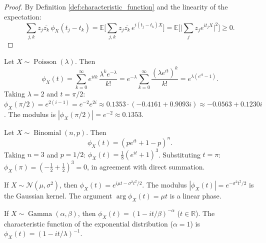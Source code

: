 \begin{proof}
By Definition \ref{def:characteristic_function} and the linearity of the expectation:
\[
\sum_{j,k} z_j \overline{z_k}\, \phi_X(t_j - t_k)
= \mathbb{E}\Big[ \sum_{j,k} z_j \overline{z_k}\, e^{i(t_j - t_k) X} \Big]
= \mathbb{E}\Big[ \Big| \sum_{j} z_j e^{it_j X} \Big|^2 \Big] \ge 0.
\]
\end{proof}

\begin{example}\label{ch14_poisson_char_example}
Let $X \sim \operatorname{Poisson}(\lambda)$. Then
\[
\phi_X(t) = \sum_{k=0}^{\infty} e^{itk}\, \frac{\lambda^k e^{-\lambda}}{k!}
= e^{-\lambda} \sum_{k=0}^{\infty} \frac{(\lambda e^{it})^k}{k!}
= e^{\lambda (e^{it} - 1)}.
\]
Taking $\lambda = 2$ and $t = \pi/2$: $\phi_X(\pi/2) = e^{2(i-1)} = e^{-2} e^{2i} \approx 0.1353 \cdot (-0.4161 + 0.9093 i) \approx -0.0563 + 0.1230 i$. The modulus is $|\phi_X(\pi/2)| = e^{-2} \approx 0.1353$.
\end{example}

\begin{example}\label{ch14_binomial_char_example}
Let $X \sim \operatorname{Binomial}(n, p)$. Then
\[
\phi_X(t) = (p e^{it} + 1 - p)^n.
\]
Taking $n = 3$ and $p = 1/2$: $\phi_X(t) = \tfrac18 (e^{it} + 1)^3$. Substituting $t = \pi$: $\phi_X(\pi) = (-\tfrac12 + \tfrac12)^3 = 0$, in agreement with direct summation.
\end{example}

\begin{example}\label{ex:normal_characteristic}
If $X \sim \mathcal{N}(\mu, \sigma^2)$, then $\phi_X(t) = e^{i\mu t - \sigma^2 t^2/2}$. The modulus $|\phi_X(t)| = e^{-\sigma^2 t^2/2}$ is the Gaussian kernel. The argument $\arg \phi_X(t) = \mu t$ is a linear phase.
\end{example}

\begin{example}\label{ex:gamma_characteristic}
If $X \sim \operatorname{Gamma}(\alpha, \beta)$, then $\phi_X(t) = (1 - it/\beta)^{-\alpha}$ ($t \in \mathbb{R}$). The characteristic function of the exponential distribution ($\alpha = 1$) is $\phi_X(t) = (1 - it/\lambda)^{-1}$.
\end{example}

